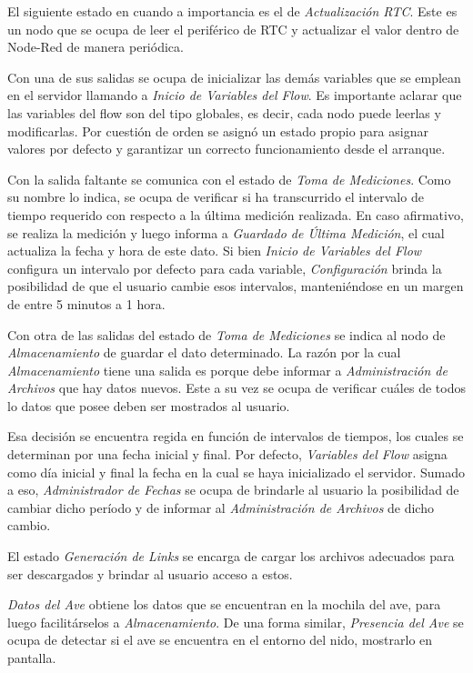 El siguiente estado en cuando a importancia es el de \textit{Actualización RTC}. Este es un nodo que se ocupa de leer el periférico de RTC y actualizar el valor dentro de Node-Red de manera periódica.

Con una de sus salidas se ocupa de inicializar las demás variables que se emplean en el servidor llamando a \textit{Inicio de Variables del Flow}. Es importante aclarar que las variables del flow son del tipo globales, es decir, cada nodo puede leerlas y modificarlas. Por cuestión de orden se asignó un estado propio para asignar valores por defecto y garantizar un correcto funcionamiento desde el arranque.

Con la salida faltante se comunica con el estado de \textit{Toma de Mediciones}. Como su nombre lo indica, se ocupa de verificar si ha transcurrido el intervalo de tiempo requerido con respecto a la última medición realizada. En caso afirmativo, se realiza la medición y luego informa a \textit{Guardado de Última Medición}, el cual actualiza la fecha y hora de este dato. Si bien \textit{Inicio de Variables del Flow} configura un intervalo por defecto para cada variable, \textit{Configuración} brinda la posibilidad de que el usuario cambie esos intervalos, manteniéndose en un margen de entre 5 minutos a 1 hora.

Con otra de las salidas del estado de \textit{Toma de Mediciones} se indica al nodo de \textit{Almacenamiento} de guardar el dato determinado. La razón por la cual \textit{Almacenamiento} tiene una salida es porque debe informar a \textit{Administración de Archivos} que hay datos nuevos. Este a su vez se ocupa de verificar cuáles de todos lo datos que posee deben ser mostrados al usuario. 

Esa decisión se encuentra regida en función de intervalos de tiempos, los cuales se determinan por una fecha inicial y final. Por defecto, \textit{Variables del Flow} asigna como día inicial y final la fecha en la cual se haya inicializado el servidor. Sumado a eso, \textit{Administrador de Fechas} se ocupa de brindarle al usuario la posibilidad de cambiar dicho período y de informar al \textit{Administración de Archivos} de dicho cambio.

El estado \textit{Generación de Links} se encarga de cargar los archivos adecuados para ser descargados y brindar al usuario acceso a estos.

\textit{Datos del Ave} obtiene los datos que se encuentran en la mochila del ave, para luego facilitárselos a \textit{Almacenamiento}. De una forma similar, \textit{Presencia del Ave} se ocupa de detectar si el ave se encuentra en el entorno del nido, mostrarlo en pantalla.

